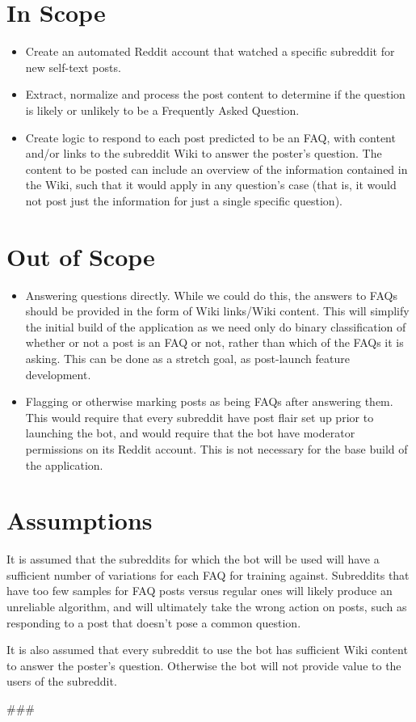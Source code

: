 \documentclass[dvips,11pt]{article}
\begin{document}
\section{In Scope}

\begin{itemize}
\item Create an automated Reddit account that watched a specific subreddit for new self-text posts.
\item Extract, normalize and process the post content to determine if the question is likely or unlikely to be a Frequently Asked Question.
\item Create logic to respond to each post predicted to be an FAQ, with content and/or links to the subreddit Wiki to answer the poster's question. The content to be posted can include an overview of the information contained in the Wiki, such that it would apply in any question's case (that is, it would not post just the information for just a single specific question).
\end{itemize}

\section{Out of Scope}

\begin{itemize}
\item Answering questions directly. While we could do this, the answers to FAQs should be provided in the form of Wiki links/Wiki content. This will simplify the initial build of the application as we need only do binary classification of whether or not a post is an FAQ or not, rather than which of the FAQs it is asking. This can be done as a stretch goal, as post-launch feature development.
\item Flagging or otherwise marking posts as being FAQs after answering them. This would require that every subreddit have post flair set up prior to launching the bot, and would require that the bot have moderator permissions on its Reddit account. This is not necessary for the base build of the application.
\end{itemize}

\section{Assumptions}

It is assumed that the subreddits for which the bot will be used will have a sufficient number of variations for each FAQ for training against. Subreddits that have too few samples for FAQ posts versus regular ones will likely produce an unreliable algorithm, and will ultimately take the wrong action on posts, such as responding to a post that doesn't pose a common question. 

It is also assumed that every subreddit to use the bot has sufficient Wiki content to answer the poster's question. Otherwise the bot will not provide value to the users of the subreddit.


\begin{center}
\#\#\#
\end{center}
\end{document}
